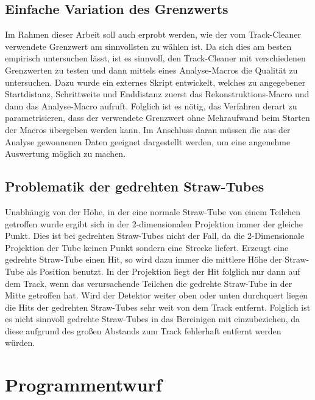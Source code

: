 \subsection{Einfache Variation des Grenzwerts}
Im Rahmen dieser Arbeit soll auch erprobt werden, wie der vom Track-Cleaner verwendete Grenzwert am sinnvollsten zu wählen ist. Da sich dies am besten empirisch untersuchen lässt, ist es sinnvoll, den Track-Cleaner mit verschiedenen Grenzwerten zu testen und dann mittels eines Analyse-Macros die Qualität zu untersuchen. Dazu wurde ein externes Skript entwickelt, welches zu angegebener Startdistanz, Schrittweite und Enddistanz zuerst das Rekonstruktions-Macro und dann das Analyse-Macro aufruft. Folglich ist es nötig, das Verfahren derart zu parametrisieren, dass der verwendete Grenzwert ohne Mehraufwand beim Starten der Macros übergeben werden kann. Im Anschluss daran müssen die aus der Analyse gewonnenen Daten geeignet dargestellt werden, um eine angenehme Auswertung möglich zu machen.

\subsection{Problematik der gedrehten Straw-Tubes}
Unabhängig von der Höhe, in der eine normale Straw-Tube von einem Teilchen getroffen wurde ergibt sich in der 2-dimensionalen Projektion immer der gleiche Punkt. Dies ist bei gedrehten Straw-Tubes nicht der Fall, da die 2-Dimensionale Projektion der Tube keinen Punkt sondern eine Strecke liefert. Erzeugt eine gedrehte Straw-Tube einen Hit, so wird dazu immer die mittlere Höhe der Straw-Tube als Position benutzt. In der Projektion liegt der Hit folglich nur dann auf dem Track, wenn das verursachende Teilchen die gedrehte Straw-Tube in der Mitte getroffen hat. Wird der Detektor weiter oben oder unten durchquert liegen die Hits der gedrehten Straw-Tubes sehr weit von dem Track entfernt. Folglich ist es nicht sinnvoll gedrehte Straw-Tubes in das Bereinigen mit einzubeziehen, da diese aufgrund des großen Abstands zum Track fehlerhaft entfernt werden würden.

\section{Programmentwurf}

